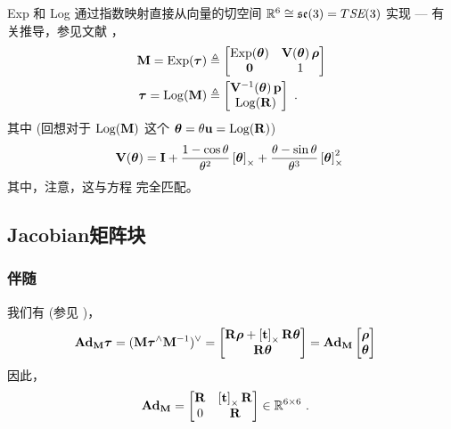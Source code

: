 Exp 和 Log 通过指数映射直接从向量的切空间 $\bbR^6\cong\se(3)=\mtan{\SE(3)}$ 实现 ---  有关推导，参见文献 \cite{EADE-Lie}，
%
\begin{align}
  \bfM = \Exp(\bftau) 
    &\te \begin{bmatrix}\Exp(\bth) & \bfV(\bth)\,\bfrho \\ \bf0 & 1  \end{bmatrix} \label{equ:SE3_Exp} \\
  \bftau = \Log(\bfM) 
    &\te \begin{bmatrix} \bfV\inv(\bth)\, \bfp \\ \Log(\bfR) \end{bmatrix}~.
\end{align}
%
其中 (回想对于 $\Log(\bfM)$ 这个 $\bth=\theta\bfu=\Log(\bfR)$)
%
\begin{align}
\bfV(\bth) = \bfI 
  + \frac{1-\cos\theta}{\theta^2}\hatx{\bftheta}
  + \frac{\theta-\sin\theta}{\theta^3}\hatx{\bftheta}^2
~
\end{align}
%
其中，注意，这与方程  完全匹配。

\subsection{Jacobian矩阵块}
\label{sec:derivatives_SE3}

\subsubsection{伴随}

我们有 (参见 )，
%
\begin{align}
\Ad[\SE(3)]{\bfM}\bftau 
  &= (\bfM\bftau^\wedge\bfM\inv)^\vee \notag 
  = \begin{bmatrix}
  \bfR\bfrho+\hatx{\bft}\bfR\bth \\
  \bfR\bth
  \end{bmatrix} \notag 
  = \Ad[\SE(3)]{\bfM}\begin{bmatrix}
  \bfrho \\ \bth
  \end{bmatrix} \notag 
\end{align}
%
因此，
%
\begin{align}
  \Ad[\SE(3)]{\bfM} &= \begin{bmatrix}
  \bfR & \hatx{\bft}\bfR \\ 0 & \bfR
  \end{bmatrix} \in \bbR^{6\times6}
  ~.
\end{align}

